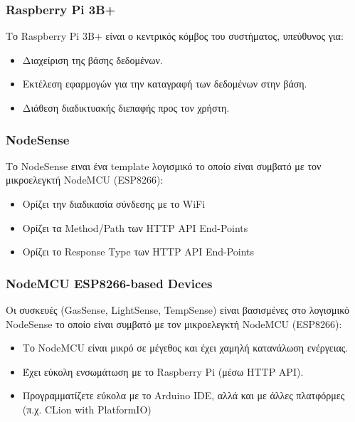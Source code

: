\documentclass{beamer}
\begin{document}
\begin{frame}
\frametitle{Raspberry Pi 3B+}
Το Raspberry Pi 3B+ είναι ο κεντρικός κόμβος του συστήματος, υπεύθυνος για:
\begin{itemize}
    \item Διαχείριση της βάσης δεδομένων.
    \item Εκτέλεση εφαρμογών για την καταγραφή των δεδομένων στην βάση.
    \item Διάθεση διαδικτυακής διεπαφής προς τον χρήστη.
\end{itemize}
\end{frame}

\begin{frame}
\frametitle{NodeSense}
Το NodeSense ειναι ένα template λογισμικό το οποίο είναι συμβατό με τον μικροελεγκτή NodeMCU (ESP8266):
\begin{itemize}
    \item Ορίζει την διαδικασία σύνδεσης με το WiFi
    \item Ορίζει τα Method/Path των HTTP API End-Points
    \item Ορίζει το Response Type των HTTP API End-Points
\end{itemize}
\end{frame}

\begin{frame}
\frametitle{NodeMCU ESP8266-based Devices}
Οι συσκευές (GasSense, LightSense, TempSense) είναι βασισμένες στο λογισμικό NodeSense το οποίο είναι συμβατό με τον μικροελεγκτή NodeMCU (ESP8266):
\begin{itemize}
    \item Το NodeMCU είναι μικρό σε μέγεθος και έχει χαμηλή κατανάλωση ενέργειας.
    \item Έχει εύκολη ενσωμάτωση με το Raspberry Pi (μέσω HTTP API).
    \item Προγραμματίζετε εύκολα με το Arduino IDE, αλλά και με άλλες πλατφόρμες (π.χ. CLion with PlatformIO)
\end{itemize}
\end{frame}
\end{document}
